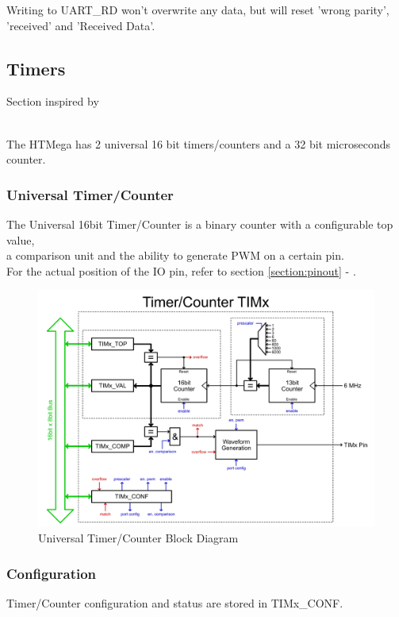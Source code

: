 Writing to UART\_RD won't overwrite any data, but will reset 'wrong parity', 'received' and 'Received Data'.
\newpage

\subsection{Timers}
\begin{footnotesize}Section inspired by \cite{atmega328p-timers} \end{footnotesize}\\
The HTMega has 2 universal 16 bit timers/counters and a 32 bit microseconds counter.

\subsubsection{Universal Timer/Counter}
The Universal 16bit Timer/Counter is a binary counter with a configurable top value,\\
a comparison unit and the ability to generate PWM on a certain pin.\\
For the actual position of the IO pin, refer to section \ref{section:pinout} - .

\begin{figure}[h]
    \begin{center}
        \includegraphics[scale=0.28]{assets/TIMx.png}
    \end{center}
    \caption{Universal Timer/Counter Block Diagram}
\end{figure}
\newpage 


\subsubsection{Configuration}
Timer/Counter configuration and status are stored in TIMx\_CONF.\\

